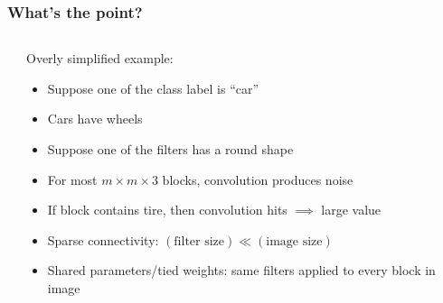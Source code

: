 \begin{frame}
    \frametitle{What's the point?}

    \begin{columns}
        \begin{column}{0.31\textwidth}
            
        \end{column}
        \begin{column}{0.69\textwidth}
            Overly simplified example:
            \begin{itemize}[<+->]
                \item Suppose one of the class label is ``car''
                \item Cars have wheels
                \item Suppose one of the filters has a round shape
                \item For most $m \times m \times 3$ blocks, convolution produces noise
                \setcounter{beamerpauses}{10}
                \item If block contains tire, then convolution hits $\implies$ large value
            \end{itemize}

            \begin{itemize}[<.->]
                \item \alert{Sparse connectivity}: $(\text{filter size}) \ll (\text{image size})$
                \item \alert{Shared parameters}/\alert{tied weights}: same filters applied to every block in image
            \end{itemize}
        \end{column}
    \end{columns}
\end{frame}

